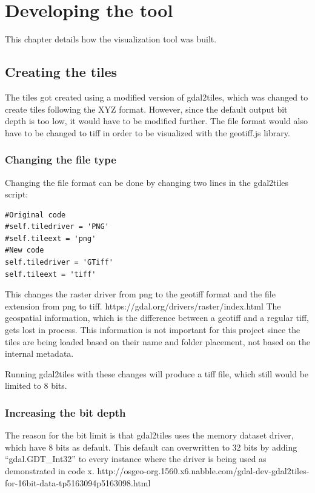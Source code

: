 \chapter{Developing the tool}
This chapter details how the visualization tool was built.

\section{Creating the tiles}
The tiles got created using a modified version of gdal2tiles, which was changed to create tiles following the XYZ format. However, since the default output bit depth is too low, it would have to be modified further. The file format would also have to be changed to tiff in order to be visualized with the geotiff.js library. 

\subsection{Changing the file type}
Changing the file format can be done by changing two lines in the gdal2tiles script:

\begin{lstlisting}[language=iPython, caption={Changing the file format}, label= VoresPY,escapechar=|]
#Original code
#self.tiledriver = 'PNG'
#self.tileext = 'png'
#New code
self.tiledriver = 'GTiff'
self.tileext = 'tiff'
\end{lstlisting}
This changes the raster driver from png to the geotiff format and the file extension from png to tiff. 
https://gdal.org/drivers/raster/index.html
The geospatial information, which is the difference between a geotiff and a regular tiff, gets lost in process. This information is not important for this project since the tiles are being loaded based on their name and folder placement, not based on the internal metadata.

Running gdal2tiles with these changes will produce a tiff file, which still would be limited to 8 bits. 
\subsection{Increasing the bit depth}
The reason for the bit limit is that gdal2tiles uses the memory dataset driver, which have 8 bits as default.  This default can overwritten to 32 bits by adding “gdal.GDT\_Int32” to every instance where the driver is being used as demonstrated in code x. 
http://osgeo-org.1560.x6.nabble.com/gdal-dev-gdal2tiles-for-16bit-data-tp5163094p5163098.html

